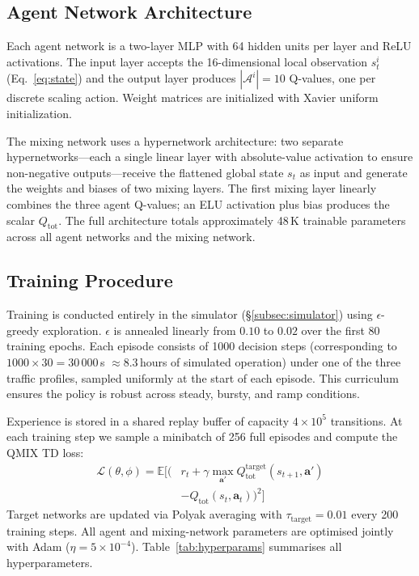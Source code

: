 \documentclass[conference]{IEEEtran}
\begin{document}
\subsection{Agent Network Architecture}

Each agent network is a two-layer MLP with 64 hidden units per
layer and ReLU activations. The input layer accepts the
16-dimensional local observation $s_t^i$ (Eq.~\ref{eq:state}) and
the output layer produces $|\mathcal{A}^i| = 10$ Q-values, one per
discrete scaling action. Weight matrices are initialized with
Xavier uniform initialization.

The mixing network uses a hypernetwork architecture: two separate
hypernetworks---each a single linear layer with absolute-value
activation to ensure non-negative outputs---receive the flattened
global state $s_t$ as input and generate the weights and biases of
two mixing layers. The first mixing layer linearly combines the
three agent Q-values; an ELU activation plus bias produces the
scalar $Q_{\mathrm{tot}}$. The full architecture totals
approximately 48\,K trainable parameters across all agent networks
and the mixing network.

\subsection{Training Procedure}

Training is conducted entirely in the simulator
(\S\ref{subsec:simulator}) using $\epsilon$-greedy exploration.
$\epsilon$ is annealed linearly from $0.10$ to $0.02$ over the first
80 training epochs. Each episode consists of 1000 decision
steps (corresponding to $1000 \times 30 = 30\,000$\,s $\approx 8.3$\,hours
of simulated operation) under one of the three traffic profiles,
sampled uniformly at the start of each episode. This curriculum
ensures the policy is robust across steady, bursty, and ramp
conditions.

Experience is stored in a shared replay buffer of capacity
$4\times10^5$ transitions. At each training step we sample a
minibatch of 256 full episodes and compute the QMIX TD loss:
\begin{equation}
\begin{aligned}
\mathcal{L}(\theta,\phi) =
\mathbb{E}\Big[\big(
&r_t + \gamma\max_{\mathbf{a}'} Q_{\mathrm{tot}}^{\text{target}}(s_{t+1}, \mathbf{a}') \\
&- Q_{\mathrm{tot}}(s_t, \mathbf{a}_t)
\big)^2\Big]
\end{aligned}
\label{eq:loss}
\end{equation}
Target networks are updated via Polyak averaging with
$\tau_{\mathrm{target}} = 0.01$ every 200 training steps.
All agent and mixing-network parameters are optimised jointly with
Adam ($\eta = 5\times10^{-4}$). Table~\ref{tab:hyperparams}
summarises all hyperparameters.
\end{document}

